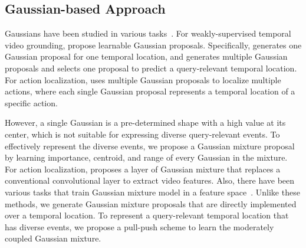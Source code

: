 \subsection{Gaussian-based Approach}
\label{sec:gaussian-proposals-in-video}

Gaussians have been studied in various tasks~\cite{zong2018deep, lee2018simple, piergiovanni2019temporal, long2019gaussian, zheng2022cnm, zheng2022cpl}.
For weakly-supervised temporal video grounding, \cite{zheng2022cnm, zheng2022cpl} propose learnable Gaussian proposals.
Specifically, \cite{zheng2022cnm} generates one Gaussian proposal for one temporal location, and \cite{zheng2022cpl} generates multiple Gaussian proposals and selects one proposal to predict a query-relevant temporal location.
For action localization, 
\cite{long2019gaussian} uses multiple Gaussian proposals to localize multiple actions, where each single Gaussian proposal represents a temporal location of a specific action.

However, a single Gaussian is a pre-determined shape with a high value at its center, which is not suitable for expressing diverse query-relevant events.
To effectively represent the diverse events, we propose a Gaussian mixture proposal by learning importance, centroid, and range of every Gaussian in the mixture.
For action localization,
\cite{piergiovanni2019temporal} proposes a layer of Gaussian mixture that replaces a conventional convolutional layer to extract video features.
Also, there have been various tasks that train Gaussian mixture model in a feature space~\cite{zong2018deep, lee2018simple}.
Unlike these methods, we generate Gaussian mixture proposals that are directly implemented over a temporal location.
To represent a query-relevant temporal location that has diverse events, we propose a pull-push scheme to learn the moderately coupled Gaussian mixture.


